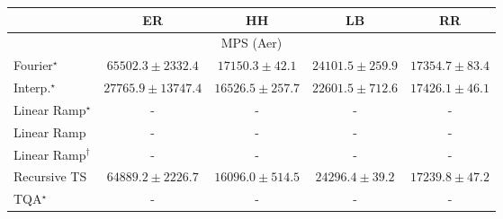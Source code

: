 \begin{tabular}{l|cccc|}
\toprule
            & ER & HH & LB & RR \\
\midrule
\multicolumn{5}{c}{\rule{0pt}{8pt}MPS (Aer)} \\
\midrule
Fourier$^\star$ & {\cellcolor[HTML]{863293}} \color[HTML]{F1F1F1} $65502.3\pm 2332.4$ & {\cellcolor[HTML]{EDF5F9}} \color[HTML]{000000} $17150.3\pm 42.1$ & {\cellcolor[HTML]{D7E5F0}} \color[HTML]{000000} $24101.5\pm 259.9$ & {\cellcolor[HTML]{ECF4F9}} \color[HTML]{000000} $17354.7\pm 83.4$ \\
Interp.$^\star$ & {\cellcolor[HTML]{C8DAEA}} \color[HTML]{000000} $27765.9\pm 13747.4$ & {\cellcolor[HTML]{EEF6FA}} \color[HTML]{000000} $16526.5\pm 257.7$ & {\cellcolor[HTML]{DDEAF3}} \color[HTML]{000000} $22601.5\pm 712.6$ & {\cellcolor[HTML]{ECF4F9}} \color[HTML]{000000} $17426.1\pm 46.1$ \\
Linear Ramp$^\star$ & {\cellcolor[HTML]{000000}} \color[HTML]{F1F1F1} {\cellcolor{white}} \color{black} - & {\cellcolor[HTML]{000000}} \color[HTML]{F1F1F1} {\cellcolor{white}} \color{black} - & {\cellcolor[HTML]{000000}} \color[HTML]{F1F1F1} {\cellcolor{white}} \color{black} - & {\cellcolor[HTML]{000000}} \color[HTML]{F1F1F1} {\cellcolor{white}} \color{black} - \\
Linear Ramp & {\cellcolor[HTML]{000000}} \color[HTML]{F1F1F1} {\cellcolor{white}} \color{black} - & {\cellcolor[HTML]{000000}} \color[HTML]{F1F1F1} {\cellcolor{white}} \color{black} - & {\cellcolor[HTML]{000000}} \color[HTML]{F1F1F1} {\cellcolor{white}} \color{black} - & {\cellcolor[HTML]{000000}} \color[HTML]{F1F1F1} {\cellcolor{white}} \color{black} - \\
Linear Ramp$^\dagger$ & {\cellcolor[HTML]{000000}} \color[HTML]{F1F1F1} {\cellcolor{white}} \color{black} - & {\cellcolor[HTML]{000000}} \color[HTML]{F1F1F1} {\cellcolor{white}} \color{black} - & {\cellcolor[HTML]{000000}} \color[HTML]{F1F1F1} {\cellcolor{white}} \color{black} - & {\cellcolor[HTML]{000000}} \color[HTML]{F1F1F1} {\cellcolor{white}} \color{black} - \\
Recursive TS & {\cellcolor[HTML]{873696}} \color[HTML]{F1F1F1} $64889.2\pm 2226.7$ & {\cellcolor[HTML]{F0F7FA}} \color[HTML]{000000} $16096.0\pm 514.5$ & {\cellcolor[HTML]{D6E4F0}} \color[HTML]{000000} $24296.4\pm 39.2$ & {\cellcolor[HTML]{ECF4F9}} \color[HTML]{000000} $17239.8\pm 47.2$ \\
TQA$^\star$ & {\cellcolor[HTML]{000000}} \color[HTML]{F1F1F1} {\cellcolor{white}} \color{black} - & {\cellcolor[HTML]{000000}} \color[HTML]{F1F1F1} {\cellcolor{white}} \color{black} - & {\cellcolor[HTML]{000000}} \color[HTML]{F1F1F1} {\cellcolor{white}} \color{black} - & {\cellcolor[HTML]{000000}} \color[HTML]{F1F1F1} {\cellcolor{white}} \color{black} - \\

\end{tabular}
